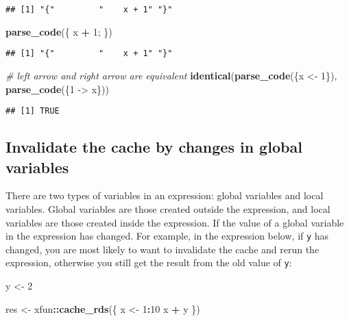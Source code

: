\documentclass[
  11pt,
]{krantz}
\newenvironment{Shaded}{\begin{snugshade}}{\end{snugshade}}
\newcommand{\CommentTok}[1]{\textcolor[rgb]{0.37,0.37,0.37}{\textit{#1}}}
\newcommand{\DecValTok}[1]{\textcolor[rgb]{0.06,0.06,0.06}{#1}}
\newcommand{\KeywordTok}[1]{\textcolor[rgb]{0.27,0.27,0.27}{\textbf{#1}}}
\newcommand{\NormalTok}[1]{#1}
\newcommand{\OperatorTok}[1]{\textcolor[rgb]{0.43,0.43,0.43}{\textbf{#1}}}
\newcommand{\StringTok}[1]{\textcolor[rgb]{0.5,0.5,0.5}{#1}}
\begin{document}
\begin{verbatim}
## [1] "{"         "    x + 1" "}"
\end{verbatim}

\begin{Shaded}
\begin{Highlighting}[]
\KeywordTok{parse_code}\NormalTok{(\{ x   }\OperatorTok{+}\StringTok{    }\DecValTok{1}\NormalTok{; \})}
\end{Highlighting}
\end{Shaded}

\begin{verbatim}
## [1] "{"         "    x + 1" "}"
\end{verbatim}

\begin{Shaded}
\begin{Highlighting}[]
\CommentTok{# left arrow and right arrow are equivalent}
\KeywordTok{identical}\NormalTok{(}\KeywordTok{parse_code}\NormalTok{(\{x <-}\StringTok{ }\DecValTok{1}\NormalTok{\}), }\KeywordTok{parse_code}\NormalTok{(\{}\DecValTok{1}\NormalTok{ ->}\StringTok{ }\NormalTok{x\}))}
\end{Highlighting}
\end{Shaded}

\begin{verbatim}
## [1] TRUE
\end{verbatim}

\hypertarget{invalidate-the-cache-by-changes-in-global-variables}{%
\subsection{Invalidate the cache by changes in global variables}\label{invalidate-the-cache-by-changes-in-global-variables}}

There are two types of variables in an expression: global variables and local variables. Global variables are those created outside the expression, and local variables are those created inside the expression. If the value of a global variable in the expression has changed. For example, in the expression below, if \texttt{y} has changed, you are most likely to want to invalidate the cache and rerun the expression, otherwise you still get the result from the old value of \texttt{y}:

\begin{Shaded}
\begin{Highlighting}[]
\NormalTok{y <-}\StringTok{ }\DecValTok{2}

\NormalTok{res <-}\StringTok{ }\NormalTok{xfun}\OperatorTok{::}\KeywordTok{cache_rds}\NormalTok{(\{}
\NormalTok{  x <-}\StringTok{ }\DecValTok{1}\OperatorTok{:}\DecValTok{10}
\NormalTok{  x }\OperatorTok{+}\StringTok{ }\NormalTok{y}
\NormalTok{\})}
\end{Highlighting}
\end{Shaded}
\end{document}

